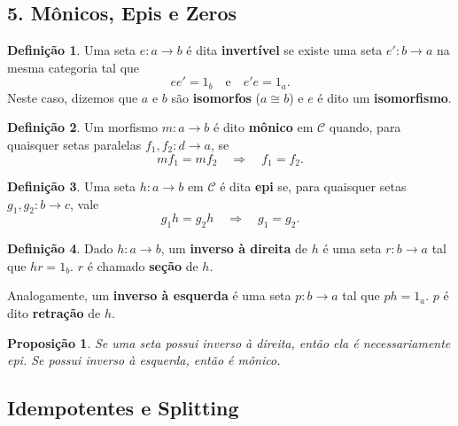 \documentclass{article}
\theoremstyle{plain}                    %
\newtheorem*{proposition}{Proposição}
\theoremstyle{definition}
\newtheorem*{definition}{Definição}
\theoremstyle{remark}
\begin{document}
\begin{adendo}
    
\section*{5. Mônicos, Epis e Zeros}

\begin{definition}
Uma seta $e: a \to b$ é dita \textbf{invertível} se existe uma seta $e': b \to a$ na mesma categoria tal que 
$$ee' = 1_b \quad \text{e} \quad e'e = 1_a.$$
Neste caso, dizemos que $a$ e $b$ são \textbf{isomorfos} ($a \cong b$) e $e$ é dito um \textbf{isomorfismo}.
\end{definition}

\end{adendo}
\begin{adendo}
    
\begin{definition}
Um morfismo $m: a \to b$ é dito \textbf{mônico} em $\mathcal{C}$ quando, para quaisquer setas paralelas $f_1, f_2: d \to a$, se
$$m f_1 = m f_2 \quad \Rightarrow \quad f_1 = f_2.$$
\end{definition}

\begin{definition}
Uma seta $h: a \to b$ em $\mathcal{C}$ é dita \textbf{epi} se, para quaisquer setas $g_1, g_2: b \to c$, vale
$$g_1 h = g_2 h \quad \Rightarrow \quad g_1 = g_2.$$
\end{definition}

\begin{definition}
Dado $h: a \to b$, um \textbf{inverso à direita} de $h$ é uma seta $r: b \to a$ tal que $hr = 1_b$.  
$r$ é chamado \textbf{seção} de $h$.

Analogamente, um \textbf{inverso à esquerda} é uma seta $p: b \to a$ tal que $ph = 1_a$.  
$p$ é dito \textbf{retração} de $h$.
\end{definition}

\begin{proposition}
Se uma seta possui inverso à direita, então ela é necessariamente epi.  
Se possui inverso à esquerda, então é mônico.
\end{proposition}

\subsection*{Idempotentes e Splitting}


\end{adendo}
\end{document}
